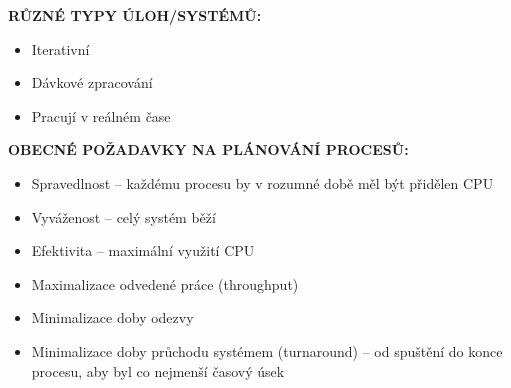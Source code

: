 \documentclass[10pt,a4paper]{article}
\begin{document}
\textbf{RŮZNÉ TYPY ÚLOH/SYSTÉMŮ:}
\begin{itemize}
	\item Iterativní
	\item Dávkové zpracování
	\item Pracují v reálném čase
\end{itemize}

\textbf{OBECNÉ POŽADAVKY NA PLÁNOVÁNÍ PROCESŮ:}
\begin{itemize}
	\item Spravedlnost – každému procesu by v rozumné době měl být přidělen CPU
	\item Vyváženost – celý systém běží
	\item Efektivita – maximální využití CPU
	\item Maximalizace odvedené práce (throughput)
	\item Minimalizace doby odezvy
	\item Minimalizace doby průchodu systémem (turnaround) – od spuštění do konce procesu, aby byl co nejmenší časový úsek
\end{itemize}
\end{document}
